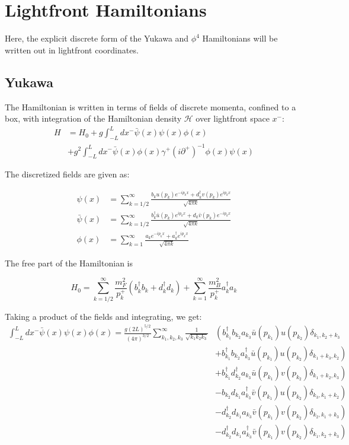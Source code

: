 \section{Lightfront Hamiltonians}
\label{subsec:lightfront-hamiltonian}
Here, the explicit discrete form of the Yukawa and $\phi^4$ Hamiltonians will be written out in lightfront coordinates. 

\subsection{Yukawa}
The Hamiltonian is written in terms of fields of discrete momenta, confined to a box, with integration of the Hamiltonian density $\mathcal{H}$ over lightfront space $x^-$:
\begin{align}
    \label{eq:yukawa-hamiltonian-fields}
    H &= H_0 + g\int_{-L}^L dx^- \bar \psi(x) \psi(x) \phi(x)\\ 
    &+ g^2\int_{-L}^L  dx^- \bar \psi(x) \phi(x) \gamma^+\left(i\partial^+ \right)^{-1}\phi(x) \psi(x) \nonumber
\end{align}

The discretized fields are given as:

\begin{align}
    \psi(x) &= \sum_{k = 1/2}^\infty\frac{b_k u(p_k)e^{-ip_k x} + d_k^\dagger v(p_k)e^{ip_k x}}{\sqrt{4\pi k}}\\ 
    \bar \psi(x)&= \sum_{k = 1/2}^\infty\frac{b_k^\dagger \bar u(p_k)e^{ip_k x} + d_k \bar v(p_k)e^{-ip_k x}}{\sqrt{4\pi k}}\\
    \phi(x) &= \sum_{k = 1}^\infty\frac{a_k e^{-ip_k x} + a_k^\dagger e^{ip_k x}}{\sqrt{4\pi k}}
\end{align}

The free part of the Hamiltonian is 

\begin{equation}
    H_0 = \sum_{k = 1/2}^\infty \frac{m_F^2}{p_k^+}\left(b_k^\dagger b_k + d_k^\dagger d_k \right) + \sum_{k = 1}^\infty \frac{m_B^2}{p_k^+}a_k^\dagger a_k 
\end{equation}

Taking a product of the fields and integrating, we get: 
\begin{align*}
    \int_{-L}^L dx^- \bar \psi(x) \psi(x) \phi(x)  = \frac{g(2L)^{5/2}}{(4\pi)^{3/2}} \sum_{k_1, k_2, k_3}^\infty \frac{1}{\sqrt{k_1k_2k_3}}& \left(  b_{k_1}^\dagger b_{k_2}a_{k_3}\bar u(p_{k_1})u(p_{k_2})\delta_{k_1, k_2 + k_3}  \right. \\
      &\left. + b_{k_1}^\dagger b_{k_2}a^\dagger_{k_3}\bar u(p_{k_1})u(p_{k_2})\delta_{k_1 + k_3, k_2} \right)\\
      &\left. + b_{k_1}^\dagger d_{k_2}^\dagger a_{k_3} \bar u(p_{k_1})v(p_{k_2})\delta_{k_1 + k_2, k_3} \right)\\
      &\left. -  b_{k_2}d_{k_1} a^\dagger_{k_3}\bar v(p_{k_1})u(p_{k_2})\delta_{k_3, k_1 + k_2} \right)\\
      &\left. -d_{k_2}^\dagger d_{k_1}  a_{k_3}\bar v(p_{k_1})v(p_{k_2})\delta_{k_2, k_1 + k_3} \right)\\
      &\left. -d_{k_2}^\dagger d_{k_1}  a^\dagger_{k_3}\bar v(p_{k_1})v(p_{k_2})\delta_{k_1, k_2 + k_3} \right)
\end{align*}

